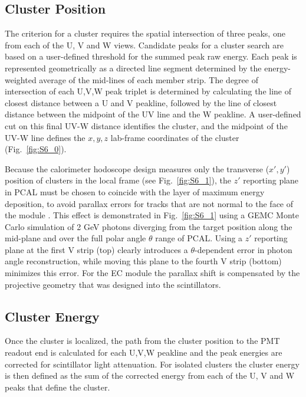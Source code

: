 \subsection {Cluster Position}
The criterion for a cluster requires the spatial intersection of three peaks, one from each of the U, V and W views.  Candidate peaks for a cluster search are based on a user-defined threshold for the summed peak raw energy.  Each peak is represented geometrically as a directed line segment determined by the energy-weighted average of the mid-lines of each member strip.   The degree of intersection of each U,V,W peak triplet is determined by calculating the line of closest distance between a U and V peakline, followed by the line of closest distance between the midpoint of the UV line and the W peakline.  A user-defined cut on this final UV-W distance identifies the cluster, and the midpoint of the UV-W line defines the $x,y,z$ lab-frame coordinates of the cluster (Fig.~\ref{fig:S6_0}).  

Because the calorimeter hodoscope design measures only the transverse ($x',y'$) position of clusters in the local frame (see Fig.~\ref{fig:S6_1}), the $z'$ reporting plane in PCAL must be chosen to coincide with the layer of maximum energy deposition, to avoid parallax errors for tracks that are not normal to the face of the module \cite{nima2018}.  This effect is demonstrated in Fig.~\ref{fig:S6_1} using a GEMC Monte Carlo simulation of 2 GeV photons diverging from the target position along the mid-plane and over the full polar angle $\theta$ range of PCAL.  Using a $z'$ reporting plane at the first V strip (top) clearly introduces a $
\theta$-dependent error in photon angle reconstruction, while moving this plane to the fourth V strip (bottom) minimizes this error.  For the EC module the parallax shift is compensated by the projective geometry that was designed into the scintillators.   

\subsection {Cluster Energy}

Once the cluster is localized, the path from the cluster position to the PMT readout end is calculated for each U,V,W peakline and the peak energies are corrected for scintillator light attenuation.  For isolated clusters the cluster energy is then defined as the sum of the corrected energy from each of the U, V and W peaks that define the cluster.  

